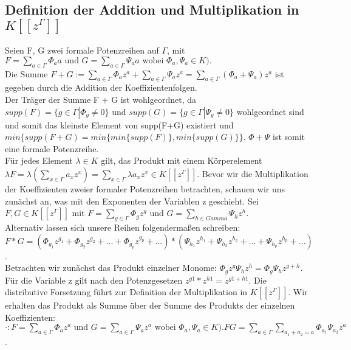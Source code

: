 \subsection{Definition der Addition und Multiplikation in $K[[z^{\Gamma}]]$}
Seien F, G zwei formale Potenzreihen auf $\Gamma$, mit $F = \sum_{a \in \Gamma}^{} \Phi_a a \text{ und } G = \sum_{a \in \Gamma}^{} \Psi_a a \text{ wobei } \Phi_a, \Psi_a \in K). $ \\
Die Summe $ F + G := \sum_{a \in \Gamma}^{} \Phi_a z^a + \sum_{a \in \Gamma}^{} \Psi_a z^a = \sum_{a \in \Gamma}^{}\left(\Phi_a + \Psi_a\right)z^a $ ist gegeben durch die Addition der Koeffizientenfolgen. \\
Der Träger der Summe F + G ist wohlgeordnet, da $supp(F) =\lbrace g \in \Gamma| \Phi_{g} \neq 0 \rbrace \text{ und } supp(G)=\lbrace g \in \Gamma| \Psi_{g} \neq 0 \rbrace$ wohlgeordnet sind und somit das kleinste Element von supp(F+G) existiert und $min\lbrace supp(F+ G) = min\lbrace min\lbrace supp(F)\rbrace, min\lbrace supp(G)\rbrace \rbrace $. $\Phi + \Psi$ ist somit eine formale Potenzreihe. \\
%
Für jedes Element $\lambda \in K$ gilt, das Produkt mit einem Körperelement $\lambda F = \lambda (\sum_{x \in \Gamma}^{}a_x z^x) = \sum_{x \in \Gamma}^{}\lambda a_x z^x \in K[[z^{\Gamma}]]$.  
Bevor wir die Multiplikation der Koeffizienten zweier formaler Potenzreihen betrachten, schauen wir uns zunächst an, was mit den Exponenten der Variablen z geschieht. Sei $F, G \in K[[z^{\Gamma}]]$ mit $ F = \sum_{g \in \Gamma}^{} \Phi_g z^g \text{ und } G = \sum_{h \in Gamma}^{} \Psi_h z^h $. \\
Alternativ lassen sich unsere Reihen folgendermaßen schreiben: 
$ F*G = \left(\Phi_{g_1}z^{g_1} + \Phi_{g_2}z^{g_2} + ... + \Phi_{g_p}z^{g_p} + ...\right) *\left( \Psi_{h_1}z^{h_1} + \Psi_{h_2}z^{h_2} + ... + \Psi_{h_p}z^{h_p} + ...\right) $. \\
Betrachten wir zunächst das Produkt einzelner Monome: $\Phi_gz^g  \Psi_hz^h = \Phi_g  \Psi_h z^{g+h} $. Für die Variable z gilt nach den Potenzgesetzen $z^{g1} * z^{h1} = z^{g1 + h1}$. Die distributive Forsetzung führt zur Definition der Multiplikation in $K[[z^{\Gamma}]]$. Wir erhalten das Produkt als Summe über der Summe des Produkts der einzelnen Koeffizienten: \\
 $\cdot: F = \sum_{a \in \Gamma}^{} \Phi_a z^a \text{ und } G = \sum_{a \in \Gamma}^{} \Psi_a z^a \text{ wobei } \Phi_a, \Psi_a \in K). FG = \sum_{a \in \Gamma}^{}\sum_{a_1 + a_2 = a}^{}\Phi_{a_1} \Psi_{a_2}z^a$.  \label{multPotenzreihenkoerper}                            \\
